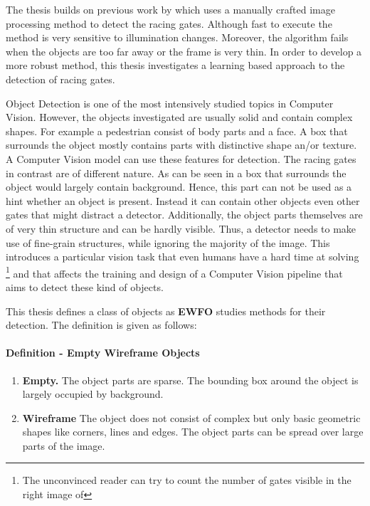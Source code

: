 The thesis builds on previous work by  \citeauthor{Li2018b} \cite{Li2018b} which uses a manually crafted image processing method to detect the racing gates. Although fast to execute the method is very sensitive to illumination changes. Moreover, the algorithm fails when the objects are too far away or the frame is very thin. In order to develop a more robust method, this thesis investigates a learning based approach to the detection of racing gates.

Object Detection is one of the most intensively studied topics in Computer Vision. However, the objects investigated are usually solid and contain complex shapes. For example a pedestrian consist of body parts and a face. A box that surrounds the object mostly contains parts with distinctive shape an/or texture. A Computer Vision model can use these features for detection. The racing gates in contrast are of different nature. As can be seen in  a box that surrounds the object would largely contain background. Hence, this part can not be used as a hint whether an object is present. Instead it can contain other objects even other gates that might distract a detector. Additionally, the object parts themselves are of very thin structure and can be hardly visible. Thus, a detector needs to make use of fine-grain structures, while ignoring the majority of the image. This introduces a particular vision task that even humans have a hard time at solving \footnote{The unconvinced reader can try to count the number of gates visible in the right image of } and that affects the training and design of a Computer Vision pipeline that aims to detect these kind of objects.

This thesis defines a class of objects as \textbf{\ac{EWFO}} studies methods for their detection. The definition is given as follows:

\paragraph{Definition - Empty Wireframe Objects}	
\begin{enumerate}
	\item \textbf{Empty.} The object parts are sparse. The bounding box around the object is largely occupied by background.
	\item \textbf{Wireframe} The object does not consist of complex but only basic geometric shapes like corners, lines and edges. The object parts can be spread over large parts of the image.

\end{enumerate}

